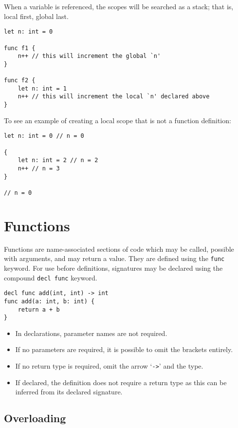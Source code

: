 \documentclass{article}
\begin{document}
When a variable is referenced, the scopes will be searched as a stack; that is, local first, global last.

\begin{lstlisting}[language=CustomLang]
let n: int = 0

func f1 {
    n++ // this will increment the global `n'
}

func f2 {
    let n: int = 1
    n++ // this will increment the local `n' declared above
}
\end{lstlisting}

To see an example of creating a local scope that is not a function definition:

\begin{lstlisting}[language=CustomLang]
let n: int = 0 // n = 0

{
    let n: int = 2 // n = 2
    n++ // n = 3
}

// n = 0
\end{lstlisting}

\section{Functions}

Functions are name-associated sections of code which may be called, possible with arguments, and may return a value.
They are defined using the \texttt{func} keyword.
For use before definitions, signatures may be declared using the compound \texttt{decl func} keyword.

\begin{lstlisting}[language=CustomLang]
decl func add(int, int) -> int
func add(a: int, b: int) {
    return a + b
}
\end{lstlisting}

\begin{itemize}
    \item In declarations, parameter names are not required.
    \item If no parameters are required, it is possible to omit the brackets entirely.
    \item If no return type is required, omit the arrow `\texttt{->}' and the type.
    \item If declared, the definition does not require a return type as this can be inferred from its declared signature.
\end{itemize}

\subsection{Overloading}
\end{document}
